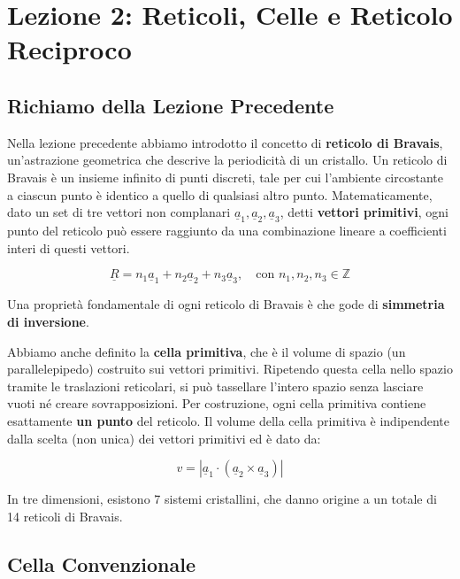 \section{Lezione 2: Reticoli, Celle e Reticolo Reciproco}
\label{appendix:lesson02}

\subsection{Richiamo della Lezione Precedente}

Nella lezione precedente abbiamo introdotto il concetto di \textbf{reticolo di Bravais}, un'astrazione geometrica che descrive la periodicità di un cristallo. Un reticolo di Bravais è un insieme infinito di punti discreti, tale per cui l'ambiente circostante a ciascun punto è identico a quello di qualsiasi altro punto. Matematicamente, dato un set di tre vettori non complanari $\underline{a}_1, \underline{a}_2, \underline{a}_3$, detti \textbf{vettori primitivi}, ogni punto del reticolo può essere raggiunto da una combinazione lineare a coefficienti interi di questi vettori.

\begin{equation}
    \underline{R} = n_1\underline{a}_1 + n_2\underline{a}_2 + n_3\underline{a}_3, \quad \text{con } n_1, n_2, n_3 \in \mathbb{Z}
\end{equation}

Una proprietà fondamentale di ogni reticolo di Bravais è che gode di \textbf{simmetria di inversione}.

Abbiamo anche definito la \textbf{cella primitiva}, che è il volume di spazio (un parallelepipedo) costruito sui vettori primitivi. Ripetendo questa cella nello spazio tramite le traslazioni reticolari, si può tassellare l'intero spazio senza lasciare vuoti né creare sovrapposizioni. Per costruzione, ogni cella primitiva contiene esattamente \textbf{un punto} del reticolo. Il volume della cella primitiva è indipendente dalla scelta (non unica) dei vettori primitivi ed è dato da:

\begin{equation}
    v = |\underline{a}_1 \cdot (\underline{a}_2 \times \underline{a}_3)|
\end{equation}

In tre dimensioni, esistono 7 sistemi cristallini, che danno origine a un totale di 14 reticoli di Bravais.

\subsection{Cella Convenzionale}

